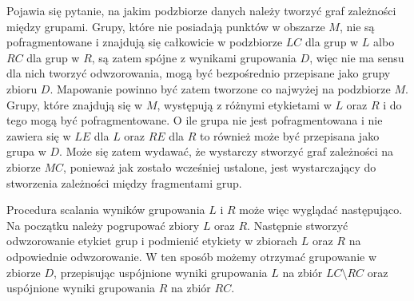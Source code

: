 Pojawia się pytanie, na jakim podzbiorze danych należy tworzyć graf zależności między grupami. Grupy, które nie posiadają punktów w obszarze $ M $, nie są pofragmentowane i znajdują się całkowicie w podzbiorze $ LC $ dla grup w $ L $ albo $ RC $ dla grup w $ R $, są zatem spójne z wynikami grupowania $ D $, więc nie ma sensu dla nich tworzyć odwzorowania, mogą być bezpośrednio przepisane jako grupy zbioru $ D $. Mapowanie powinno być zatem tworzone co najwyżej na podzbiorze $ M $. Grupy, które znajdują się w $ M $, występują z różnymi etykietami w $ L $ oraz $ R $ i do tego mogą być pofragmentowane. O ile grupa nie jest pofragmentowana i nie zawiera się w $ LE $ dla $ L $ oraz $ RE $ dla $ R $ to również może być przepisana jako grupa w $ D $. Może się zatem wydawać, że wystarczy stworzyć graf zależności na zbiorze $ MC $, ponieważ jak zostało wcześniej ustalone, jest wystarczający do stworzenia zależności między fragmentami grup.\par
Procedura scalania wyników grupowania $ L $ i $ R $ może więc wyglądać następująco. Na początku należy pogrupować zbiory $ L $ oraz $ R $. Następnie stworzyć odwzorowanie etykiet grup i podmienić etykiety w zbiorach $ L $ oraz $ R $ na odpowiednie odwzorowanie. W ten sposób możemy otrzymać grupowanie w zbiorze $ D $, przepisując uspójnione wyniki grupowania $ L $ na zbiór $ LC \setminus RC $ oraz uspójnione wyniki grupowania $ R $ na zbiór $ RC $.\par

